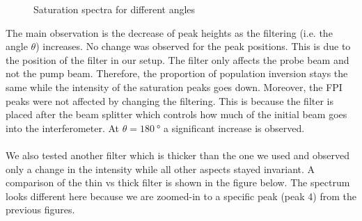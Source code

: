 \documentclass{article}
\begin{document}
\begin{figure}[H]
    \centering
    \caption{Saturation spectra for different angles}
    \label{fig:subfigures}
\end{figure}

The main observation is the decrease of peak heights as the filtering (i.e. the angle $\theta$) increases. No change was observed for the peak positions. This is due to the position of the filter in our setup. The filter only affects the probe beam and not the pump beam. Therefore, the proportion of population inversion stays the same while the intensity of the saturation peaks goes down. Moreover, the FPI peaks were not affected by changing the filtering. This is because the filter is placed after the beam splitter which controls how much of the initial beam goes into the interferometer. At $\theta=\SI{180}{\degree}$ a significant increase is observed. 
\\\\
We also tested another filter which is thicker than the one we used and observed only a change in the intensity while all other aspects stayed invariant. A comparison of the thin vs thick filter is shown in the figure below. The spectrum looks different here because we are zoomed-in to a specific peak (peak 4) from the previous figures. 


\begin{figure}[H]
    \centering

\end{figure}
\end{document}
